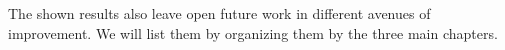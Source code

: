 The shown results also leave open future work in different avenues of improvement. We will list them by organizing them by the three main chapters.
